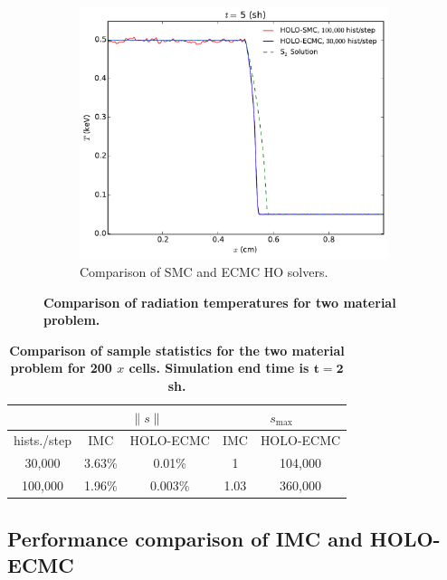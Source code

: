 \documentclass[12pt]{article}
\renewcommand{\ss}{\ensuremath{\|s\|}}
\begin{document}
\begin{center}
\begin{figure}
\begin{subfigure}{0.65\textwidth}
    \includegraphics[width=0.99\textwidth]{two_mat_ho_compare.pdf}
    \caption{Comparison of SMC and ECMC HO solvers. \label{compare_ho}}
\end{subfigure}
    \caption{\bf Comparison of radiation temperatures for two material problem. \label{twomat}}
\end{figure}


\begin{table}[H]
\centering
\caption{\label{twomat_var} \textbf{Comparison of sample statistics for the
    two material problem for 200 $x$ cells.   Simulation end time is $\mathbf{t=2}$ sh.}}
\vspace{-0.1in}
\begin{tabular}{|c|cc|cc|}\cline{2-5}
    \multicolumn{1}{c|}{}       & \multicolumn{2}{|c|}{\ss} & \multicolumn{2}{|c|}{$s_{\max}$} \\ \hline
hists./step     & IMC & HOLO-ECMC  &  IMC & HOLO-ECMC   \\ \hline
   30,000	    & 3.63\%  & 0.01\% &  1      &   104,000      \\
  100,000       & 1.96\%  & 0.003\% & 1.03   &   360,000      \\ \hline
\end{tabular}
\end{table}

\subsection{Performance comparison of IMC and HOLO-ECMC}
\label{timing}


\end{center}
\end{document}
